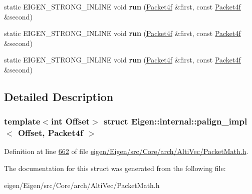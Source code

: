 \begin{DoxyCompactItemize}
static E\+I\+G\+E\+N\+\_\+\+S\+T\+R\+O\+N\+G\+\_\+\+I\+N\+L\+I\+NE void {\bfseries run} (\hyperlink{struct_eigen_1_1internal_1_1_packet4f}{Packet4f} \&first, const \hyperlink{struct_eigen_1_1internal_1_1_packet4f}{Packet4f} \&second)
\item 
\mbox{\label{struct_eigen_1_1internal_1_1palign__impl_3_01_offset_00_01_packet4f_01_4_a150fdb800bfa363cd70cc65dc9e524bc}} 
static E\+I\+G\+E\+N\+\_\+\+S\+T\+R\+O\+N\+G\+\_\+\+I\+N\+L\+I\+NE void {\bfseries run} (\hyperlink{struct_eigen_1_1internal_1_1_packet4f}{Packet4f} \&first, const \hyperlink{struct_eigen_1_1internal_1_1_packet4f}{Packet4f} \&second)
\item 
\mbox{\label{struct_eigen_1_1internal_1_1palign__impl_3_01_offset_00_01_packet4f_01_4_a150fdb800bfa363cd70cc65dc9e524bc}} 
static E\+I\+G\+E\+N\+\_\+\+S\+T\+R\+O\+N\+G\+\_\+\+I\+N\+L\+I\+NE void {\bfseries run} (\hyperlink{struct_eigen_1_1internal_1_1_packet4f}{Packet4f} \&first, const \hyperlink{struct_eigen_1_1internal_1_1_packet4f}{Packet4f} \&second)
\end{DoxyCompactItemize}


\subsection{Detailed Description}
\subsubsection*{template$<$int Offset$>$\newline
struct Eigen\+::internal\+::palign\+\_\+impl$<$ Offset, Packet4f $>$}



Definition at line \hyperlink{eigen_2_eigen_2src_2_core_2arch_2_alti_vec_2_packet_math_8h_source_l00662}{662} of file \hyperlink{eigen_2_eigen_2src_2_core_2arch_2_alti_vec_2_packet_math_8h_source}{eigen/\+Eigen/src/\+Core/arch/\+Alti\+Vec/\+Packet\+Math.\+h}.



The documentation for this struct was generated from the following file\+:\begin{DoxyCompactItemize}
\item 
eigen/\+Eigen/src/\+Core/arch/\+Alti\+Vec/\+Packet\+Math.\+h\end{DoxyCompactItemize}
